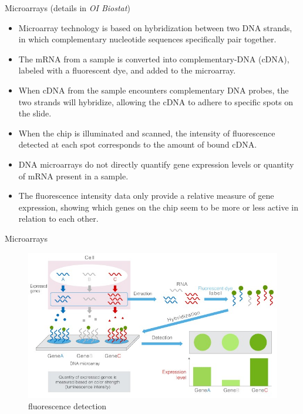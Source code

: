 \documentclass[10pt]{beamer}\usepackage[]{graphicx}\usepackage[]{color}
\begin{document}
						\begin{frame}{Microarrays (details in \emph{OI Biostat})}
							\protect\hypertarget{microarrays-details-in-oi-biostat}{}
							
							\small
							
							\begin{itemize}
								\item
								Microarray technology is based on hybridization between two DNA
								strands, in which complementary nucleotide sequences specifically pair
								together.
								\item
								The mRNA from a sample is converted into complementary-DNA (cDNA),
								labeled with a fluorescent dye, and added to the microarray.
								\item
								When cDNA from the sample encounters complementary DNA probes, the two
								strands will hybridize, allowing the cDNA to adhere to specific spots
								on the slide.
								\item
								When the chip is illuminated and scanned, the intensity of
								fluorescence detected at each spot corresponds to the amount of bound
								cDNA.
								\item
								DNA microarrays do not directly quantify gene expression levels or
								quantity of mRNA present in a sample.
								\item
								The fluorescence intensity data only provide a relative measure of
								gene expression, showing which genes on the chip seem to be more or
								less active in relation to each other.
							\end{itemize}
							
						\end{frame}
						
						\begin{frame}{Microarrays}
							\protect\hypertarget{microarrays}{}
							
							\begin{figure}
								\centering
								\includegraphics{figures/microarray_schematic.jpg}
								\caption{fluorescence detection}
							\end{figure}
							
						\end{frame}
						
\end{document}
